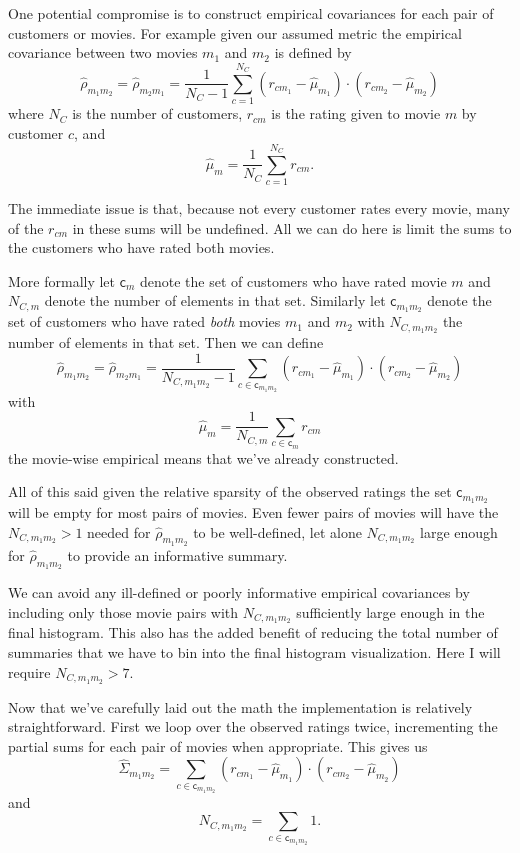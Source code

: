 \documentclass[
  letterpaper,
  DIV=11,
  numbers=noendperiod]{scrartcl}
\begin{document}
One potential compromise is to construct empirical covariances for each
pair of customers or movies. For example given our assumed metric the
empirical covariance between two movies \(m_{1}\) and \(m_{2}\) is
defined by \[
\hat{\rho}_{m_{1} m_{2}}
=
\hat{\rho}_{m_{2} m_{1}}
=
\frac{1}{N_{C} - 1} \sum_{c = 1}^{N_{C}}
(r_{c m_{1}} - \hat{\mu}_{m_{1}}) \cdot
(r_{c m_{2}} - \hat{\mu}_{m_{2}})
\] where \(N_{C}\) is the number of customers, \(r_{c m}\) is the rating
given to movie \(m\) by customer \(c\), and \[
\hat{\mu}_{m}
=
\frac{1}{N_{C}} \sum_{c = 1}^{N_{C}} r_{c m}.
\]

The immediate issue is that, because not every customer rates every
movie, many of the \(r_{c m}\) in these sums will be undefined. All we
can do here is limit the sums to the customers who have rated both
movies.

More formally let \(\mathsf{c}_{m}\) denote the set of customers who
have rated movie \(m\) and \(N_{C, m}\) denote the number of elements in
that set. Similarly let \(\mathsf{c}_{m_{1} m_{2}}\) denote the set of
customers who have rated \emph{both} movies \(m_{1}\) and \(m_{2}\) with
\(N_{C, m_{1} m_{2}}\) the number of elements in that set. Then we can
define \[
\hat{\rho}_{m_{1} m_{2}}
=
\hat{\rho}_{m_{2} m_{1}}
=
\frac{1}{N_{C, m_{1} m_{2}} - 1} \sum_{c \in \mathsf{c}_{m_{1} m_{2}}}
(r_{c m_{1}} - \hat{\mu}_{m_{1}}) \cdot
(r_{c m_{2}} - \hat{\mu}_{m_{2}})
\] with \[
\hat{\mu}_{m}
=
\frac{1}{N_{C, m}} \sum_{c \in \mathsf{c}_{m}} r_{c m}
\] the movie-wise empirical means that we've already constructed.

All of this said given the relative sparsity of the observed ratings the
set \(\mathsf{c}_{m_{1} m_{2}}\) will be empty for most pairs of movies.
Even fewer pairs of movies will have the \(N_{C, m_{1} m_{2}} > 1\)
needed for \(\hat{\rho}_{m_{1} m_{2}}\) to be well-defined, let alone
\(N_{C, m_{1} m_{2}}\) large enough for \(\hat{\rho}_{m_{1} m_{2}}\) to
provide an informative summary.

We can avoid any ill-defined or poorly informative empirical covariances
by including only those movie pairs with \(N_{C, m_{1} m_{2}}\)
sufficiently large enough in the final histogram. This also has the
added benefit of reducing the total number of summaries that we have to
bin into the final histogram visualization. Here I will require
\(N_{C, m_{1} m_{2}} > 7\).

Now that we've carefully laid out the math the implementation is
relatively straightforward. First we loop over the observed ratings
twice, incrementing the partial sums for each pair of movies when
appropriate. This gives us \[
\hat{\Sigma}_{m_{1} m_{2}}
=
\sum_{c \in \mathsf{c}_{m_{1} m_{2}}}
(r_{c m_{1}} - \hat{\mu}_{m_{1}}) \cdot
(r_{c m_{2}} - \hat{\mu}_{m_{2}})
\] and \[
N_{C, m_{1} m_{2}}
=
\sum_{c \in \mathsf{c}_{m_{1} m_{2}}} 1.
\]
\end{document}

